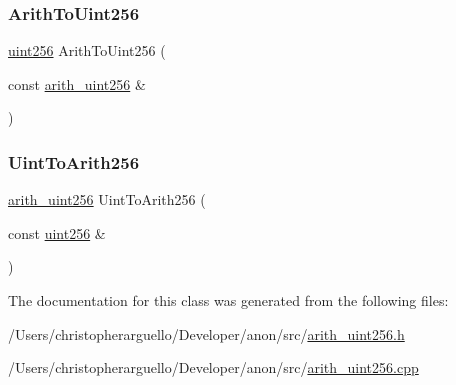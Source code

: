 \subsubsection{\texorpdfstring{Arith\+To\+Uint256}{ArithToUint256}}
{\footnotesize\ttfamily \mbox{\hyperlink{classuint256}{uint256}} Arith\+To\+Uint256 (\begin{DoxyParamCaption}\item[{const \mbox{\hyperlink{classarith__uint256}{arith\+\_\+uint256}} \&}]{ }\end{DoxyParamCaption})\hspace{0.3cm}{\ttfamily [friend]}}

\mbox{\label{classarith__uint256_a9c9f84c20851f10a8ca5082bec97666a}} 
\subsubsection{\texorpdfstring{Uint\+To\+Arith256}{UintToArith256}}
{\footnotesize\ttfamily \mbox{\hyperlink{classarith__uint256}{arith\+\_\+uint256}} Uint\+To\+Arith256 (\begin{DoxyParamCaption}\item[{const \mbox{\hyperlink{classuint256}{uint256}} \&}]{ }\end{DoxyParamCaption})\hspace{0.3cm}{\ttfamily [friend]}}



The documentation for this class was generated from the following files\+:\begin{DoxyCompactItemize}
\item 
/\+Users/christopherarguello/\+Developer/anon/src/\mbox{\hyperlink{arith__uint256_8h}{arith\+\_\+uint256.\+h}}\item 
/\+Users/christopherarguello/\+Developer/anon/src/\mbox{\hyperlink{arith__uint256_8cpp}{arith\+\_\+uint256.\+cpp}}\end{DoxyCompactItemize}

